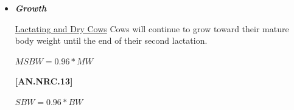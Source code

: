 \begin{refsection}
\begin{itemize}
        \vspace{0.2cm}
        \underline {Heifers}
        \vspace{0.25cm}
        
\begin{center}
    \(NEa1 = 0.0009 * BW + 0.0016 * BW\) if Housing = Grazing 0
\end{center}
\vspace{0.5cm}

            {\raggedleft \textbf{[AN.NRC.11]}\par}
\textit{\small Otherwise}
\vspace{0.25cm}

\begin{center}
    \(NEa2 = 0.006 * BW\) if Topography = Hilly 0
\end{center}
\vspace{0.5cm}

            {\raggedleft \textbf{[AN.NRC.12]}\par}
            \vspace{0.25cm}
            
\textit{\small Otherwise}
\vspace{0.25cm}

\begin{center}
    \(NEa2 = 0.Distance * 0.00045 * BW + NEa1 + NEa2\) 
\end{center}
\vspace{0.5cm}

            {\raggedleft \textbf{[AN.NRC.10]}\par}

\vspace{0.5cm}


        \item \textbf{\textit{Growth}}
        
        \vspace{0.2cm}
        \underline {Lactating and Dry Cows} Cows will continue to grow toward their mature body weight until the end of their second lactation. 
        \vspace{0.25cm}
        
\begin{center}
    \(MSBW = 0.96 * MW\)
\end{center}
\vspace{0.5cm}
            {\raggedleft \textbf{[AN.NRC.13]}\par}

\vspace{0.25cm}
\begin{center}
    \(SBW = 0.96 * BW\)
\end{center}


\end{itemize}
\end{refsection}
